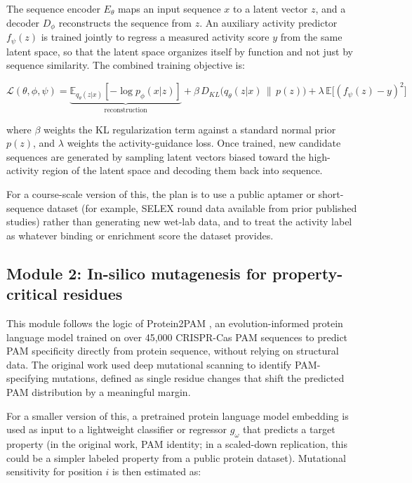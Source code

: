 \documentclass[11pt,a4paper]{article}
\begin{document}
The sequence encoder $E_\theta$ maps an input sequence $x$ to a latent vector $z$, and a decoder $D_\phi$ reconstructs the sequence from $z$. An auxiliary activity predictor $f_\psi(z)$ is trained jointly to regress a measured activity score $y$ from the same latent space, so that the latent space organizes itself by function and not just by sequence similarity. The combined training objective is:

\begin{equation}
\mathcal{L}(\theta,\phi,\psi) = \underbrace{\mathbb{E}_{q_\theta(z|x)}[-\log p_\phi(x|z)]}_{\text{reconstruction}} + \beta \, D_{KL}\big(q_\theta(z|x) \,\|\, p(z)\big) + \lambda \, \mathbb{E}\big[(f_\psi(z) - y)^2\big]
\end{equation}

where $\beta$ weights the KL regularization term against a standard normal prior $p(z)$, and $\lambda$ weights the activity-guidance loss. Once trained, new candidate sequences are generated by sampling latent vectors biased toward the high-activity region of the latent space and decoding them back into sequence.

For a course-scale version of this, the plan is to use a public aptamer or short-sequence dataset (for example, SELEX round data available from prior published studies) rather than generating new wet-lab data, and to treat the activity label as whatever binding or enrichment score the dataset provides.

\subsection{Module 2: In-silico mutagenesis for property-critical residues}

This module follows the logic of Protein2PAM \cite{protein2pam}, an evolution-informed protein language model trained on over 45{,}000 CRISPR-Cas PAM sequences to predict PAM specificity directly from protein sequence, without relying on structural data. The original work used deep mutational scanning to identify PAM-specifying mutations, defined as single residue changes that shift the predicted PAM distribution by a meaningful margin.

For a smaller version of this, a pretrained protein language model embedding is used as input to a lightweight classifier or regressor $g_\omega$ that predicts a target property (in the original work, PAM identity; in a scaled-down replication, this could be a simpler labeled property from a public protein dataset). Mutational sensitivity for position $i$ is then estimated as:
\end{document}
